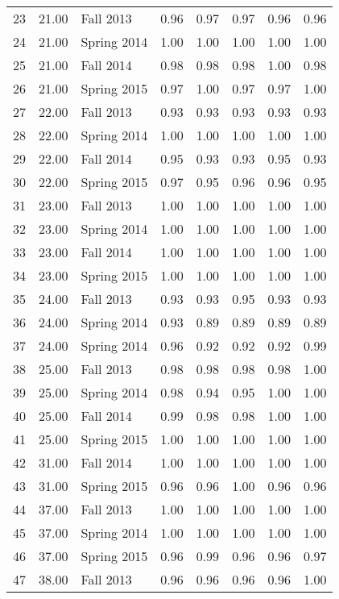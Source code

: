 \documentclass[12pt,]{article}
\begin{document}
\begin{longtable}{l|l|l|l|l|l|l|l}
  23 & 21.00 & Fall 2013 & 0.96 & 0.97 & 0.97 & 0.96 & 0.96 \\ 
  24 & 21.00 & Spring 2014 & 1.00 & 1.00 & 1.00 & 1.00 & 1.00 \\ 
  25 & 21.00 & Fall 2014 & 0.98 & 0.98 & 0.98 & 1.00 & 0.98 \\ 
  26 & 21.00 & Spring 2015 & 0.97 & 1.00 & 0.97 & 0.97 & 1.00 \\ 
  27 & 22.00 & Fall 2013 & 0.93 & 0.93 & 0.93 & 0.93 & 0.93 \\ 
  28 & 22.00 & Spring 2014 & 1.00 & 1.00 & 1.00 & 1.00 & 1.00 \\ 
  29 & 22.00 & Fall 2014 & 0.95 & 0.93 & 0.93 & 0.95 & 0.93 \\ 
  30 & 22.00 & Spring 2015 & 0.97 & 0.95 & 0.96 & 0.96 & 0.95 \\ 
  31 & 23.00 & Fall 2013 & 1.00 & 1.00 & 1.00 & 1.00 & 1.00 \\ 
  32 & 23.00 & Spring 2014 & 1.00 & 1.00 & 1.00 & 1.00 & 1.00 \\ 
  33 & 23.00 & Fall 2014 & 1.00 & 1.00 & 1.00 & 1.00 & 1.00 \\ 
  34 & 23.00 & Spring 2015 & 1.00 & 1.00 & 1.00 & 1.00 & 1.00 \\ 
  35 & 24.00 & Fall 2013 & 0.93 & 0.93 & 0.95 & 0.93 & 0.93 \\ 
  36 & 24.00 & Spring 2014 & 0.93 & 0.89 & 0.89 & 0.89 & 0.89 \\ 
  37 & 24.00 & Spring 2014 & 0.96 & 0.92 & 0.92 & 0.92 & 0.99 \\ 
  38 & 25.00 & Fall 2013 & 0.98 & 0.98 & 0.98 & 0.98 & 1.00 \\ 
  39 & 25.00 & Spring 2014 & 0.98 & 0.94 & 0.95 & 1.00 & 1.00 \\ 
  40 & 25.00 & Fall 2014 & 0.99 & 0.98 & 0.98 & 1.00 & 1.00 \\ 
  41 & 25.00 & Spring 2015 & 1.00 & 1.00 & 1.00 & 1.00 & 1.00 \\ 
  42 & 31.00 & Fall 2014 & 1.00 & 1.00 & 1.00 & 1.00 & 1.00 \\ 
  43 & 31.00 & Spring 2015 & 0.96 & 0.96 & 1.00 & 0.96 & 0.96 \\ 
  44 & 37.00 & Fall 2013 & 1.00 & 1.00 & 1.00 & 1.00 & 1.00 \\ 
  45 & 37.00 & Spring 2014 & 1.00 & 1.00 & 1.00 & 1.00 & 1.00 \\ 
  46 & 37.00 & Spring 2015 & 0.96 & 0.99 & 0.96 & 0.96 & 0.97 \\ 
  47 & 38.00 & Fall 2013 & 0.96 & 0.96 & 0.96 & 0.96 & 1.00 \\ 

\end{longtable}
\end{document}
